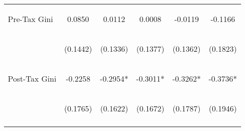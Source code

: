 \begin{center}
\begin{tabular}{lccccc}
\noalign{\smallskip}Pre-Tax Gini & \begin{scriptsize}0.0850\end{scriptsize} & \begin{scriptsize}0.0112\end{scriptsize} & \begin{scriptsize}0.0008\end{scriptsize} & \begin{scriptsize}-0.0119\end{scriptsize} & \begin{scriptsize}-0.1166\end{scriptsize}\\
 & \begin{scriptsize}(0.1442)\end{scriptsize} & \begin{scriptsize}(0.1336)\end{scriptsize} & \begin{scriptsize}(0.1377)\end{scriptsize} & \begin{scriptsize}(0.1362)\end{scriptsize} & \begin{scriptsize}(0.1823)\end{scriptsize}\\
\noalign{\smallskip}Post-Tax Gini & \begin{scriptsize}-0.2258\end{scriptsize} & \begin{scriptsize}-0.2954*\end{scriptsize} & \begin{scriptsize}-0.3011*\end{scriptsize} & \begin{scriptsize}-0.3262*\end{scriptsize} & \begin{scriptsize}-0.3736*\end{scriptsize}\\
 & \begin{scriptsize}(0.1765)\end{scriptsize} & \begin{scriptsize}(0.1622)\end{scriptsize} & \begin{scriptsize}(0.1672)\end{scriptsize} & \begin{scriptsize}(0.1787)\end{scriptsize} & \begin{scriptsize}(0.1946)\end{scriptsize}\\
\noalign{\smallskip}\hline\end{tabular}\\
\end{center}
